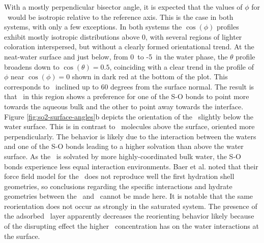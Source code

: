  With a mostly perpendicular bisector angle, it is expected that the values of $\phi$ for \suldiox~would be isotropic relative to the reference axis. This is the case in both systems, with only a few exceptions. In both systems the $\cos(\phi)$ profiles exhibit mostly isotropic distributions above 0\angs, with several regions of lighter coloration interspersed, but without a clearly formed orientational trend. At the neat-water surface and just below, from 0\angs~to -5\angs~in the water phase, the $\theta$ profile broadens down to $\cos(\theta)=0.5$, coinciding with a clear trend in the profile of $\phi$ near $\cos(\phi)=0$ shown in dark red at the bottom of the plot. This corresponds to \suldiox~inclined up to 60 degrees from the surface normal. The result is that \suldiox~in this region shows a preference for one of the S-O bonds to point more towards the aqueous bulk and the other to point away towards the interface. Figure \ref{fig:so2-surface-angles}b depicts the orientation of the \suldiox~slightly below the water surface. This is in contrast to \suldiox~molecules above the surface, oriented more perpendicularly. The behavior is likely due to the interaction between the waters and one of the S-O bonds leading to a higher solvation than above the water surface. As the \suldiox~is solvated by more highly-coordinated bulk water, the S-O bonds experience less equal interaction environments. Baer et al. noted that their force field model for the \suldiox~does not reproduce well the first hydration shell geometries,\cite{Baer2010} so conclusions regarding the specific interactions and hydrate geometries between the \suldiox~and \wat~cannot be made here. It is notable that the same reorientation does not occur as strongly in the saturated system. The presence of the adsorbed \suldiox~layer apparently decreases the reorienting behavior likely because of the disrupting effect the higher \suldiox~concentration has on the water interactions at the surface. %


